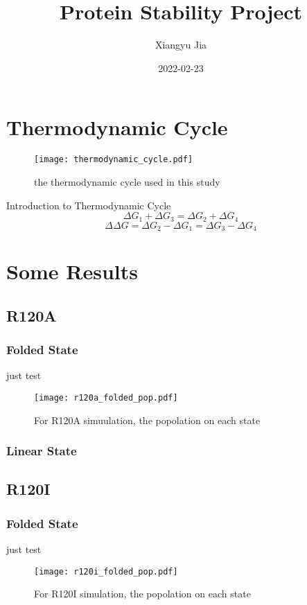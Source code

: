 \documentclass{article}
\title{Protein Stability Project}
\date{2022-02-23}
\author{Xiangyu Jia}
\begin{document}
\maketitle
\newpage
{}

\section{Thermodynamic Cycle}
\begin{figure}[h]
    \texttt{[image: thermodynamic\_cycle.pdf]}
    \caption{the thermodynamic cycle used in this study}
    \label{cycle}
\end{figure}
Introduction to Thermodynamic Cycle
\begin{equation}
    \Delta G_1+\Delta G_3=\Delta G_2 + \Delta G_4
\end{equation}    
\begin{equation}
\Delta\Delta G = \Delta G_2 - \Delta G_1 = \Delta G_3 - \Delta G_4
\end{equation}



\section{Some Results}
\subsection{R120A}
\subsubsection{Folded State}
just test
\begin{figure}[h]
    \texttt{[image: r120a\_folded\_pop.pdf]}
    \caption{For R120A simuulation, the popolation on each state}
    \label{r120apop}
\end{figure}

\subsubsection{Linear State}

\subsection{R120I}
\subsubsection{Folded State}
just test
\begin{figure}[h]
    \texttt{[image: r120i\_folded\_pop.pdf]}
    \caption{For R120I simulation, the popolation on each state}
    \label{r120ipop}
\end{figure}
\end{document}
